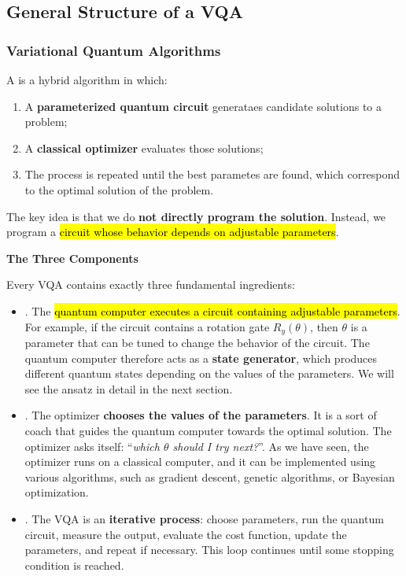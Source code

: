 \subsection{General Structure of a VQA}\label{sec:general-structure-of-a-vqa}

\subsubsection{Variational Quantum Algorithms}\label{sec:variational-quantum-algorithms}

A  is a hybrid algorithm in which:
\begin{enumerate}
    \item A \textbf{parameterized quantum circuit} generataes candidate solutions to a problem;
    \item A \textbf{classical optimizer} evaluates those solutions;
    \item The process is repeated until the best parametes are found, which correspond to the optimal solution of the problem.
\end{enumerate}
The key idea is that we do \textbf{not directly program the solution}. Instead, we program a \hl{circuit whose behavior depends on adjustable parameters}.

\highspace
\begin{flushleft}
    \textcolor{Green3}{ \textbf{The Three Components}}
\end{flushleft}
Every VQA contains exactly three fundamental ingredients:
\begin{itemize}
    \item {}. The \hl{quantum computer executes a circuit containing adjustable parameters}. For example, if the circuit contains a rotation gate $R_y(\theta)$, then $\theta$ is a parameter that can be tuned to change the behavior of the circuit. The quantum computer therefore acts as a \textbf{state generator}, which produces different quantum states depending on the values of the parameters. We will see the ansatz in detail in the next section.


    \item {}. The optimizer \textbf{chooses the values of the parameters}. It is a sort of coach that guides the quantum computer towards the optimal solution. The optimizer asks itself: ``\emph{which $\theta$ should I try next?}''. As we have seen, the optimizer runs on a classical computer, and it can be implemented using various algorithms, such as gradient descent, genetic algorithms, or Bayesian optimization.


    \item {}. The VQA is an \textbf{iterative process}: choose parameters, run the quantum circuit, measure the output, evaluate the cost function, update the parameters, and repeat if necessary. This loop continues until some stopping condition is reached.
\end{itemize}

